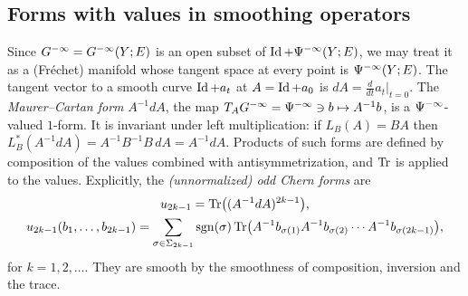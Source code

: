 \subsection{Forms with values in smoothing operators}
Since $G^{-\infty}=G^{-\infty}(Y;E)$ is an open subset of $\operatorname{Id}+\Psi^{-\infty}(Y;E)$, we
may treat it as a (Fr\'echet) manifold whose tangent space at every point is
$\Psi^{-\infty}(Y;E)$. The tangent vector to a smooth curve $\operatorname{Id}+a_t$ at
$A=\operatorname{Id}+a_0$ is $dA=\frac{d}{dt}a_t|_{t=0}$. The \emph{Maurer--Cartan form}
$A^{-1}dA$, the map $T_AG^{-\infty}=\Psi^{-\infty}\ni b\mapsto A^{-1}b$, is a
$\Psi^{-\infty}$-valued $1$-form. It is invariant under left
multiplication: if $L_B(A)=BA$ then $L_B^*(A^{-1}dA)=A^{-1}B^{-1}B\,dA=A^{-1}dA$.
Products of such forms are defined by composition of the values combined with
antisymmetrization, and $\operatorname{Tr}$ is applied to the values. Explicitly, the
\emph{(unnormalized) odd Chern forms} are
\begin{equation}\label{index:eq:chern-forms}
  \begin{gathered}
  u_{2k-1}=\operatorname{Tr}\bigl((A^{-1}dA)^{2k-1}\bigr),\\
  u_{2k-1}(b_1,\dots,b_{2k-1})=\sum_{\sigma\in\Sigma_{2k-1}}\operatorname{sgn}(\sigma)
  \operatorname{Tr}\bigl(A^{-1}b_{\sigma(1)}A^{-1}b_{\sigma(2)}\cdots A^{-1}b_{\sigma(2k-1)}
  \bigr),
  \end{gathered}
\end{equation}
for $k=1,2,\dots$. They are smooth by the smoothness of composition, inversion
and the trace.

